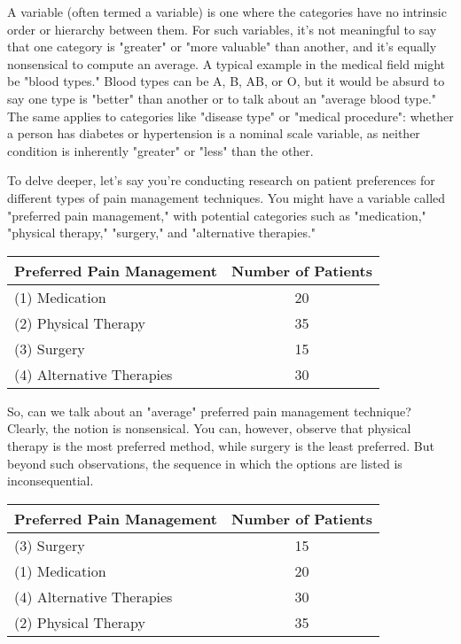 
A  variable (often termed a  variable) is one where the categories have no intrinsic order or hierarchy between them. For such variables, it's not meaningful to say that one category is "greater" or "more valuable" than another, and it's equally nonsensical to compute an average. A typical example in the medical field might be "blood types." Blood types can be A, B, AB, or O, but it would be absurd to say one type is "better" than another or to talk about an "average blood type." The same applies to categories like "disease type" or "medical procedure": whether a person has diabetes or hypertension is a nominal scale variable, as neither condition is inherently "greater" or "less" than the other.

To delve deeper, let's say you're conducting research on patient preferences for different types of pain management techniques. You might have a variable called "preferred pain management," with potential categories such as "medication," "physical therapy," "surgery," and "alternative therapies."

\vspace*{6pt}
\begin{tabular}{lc}
Preferred Pain Management & Number of Patients \\ \hline
(1) Medication & 20 \\
(2) Physical Therapy & 35 \\
(3) Surgery & 15 \\
(4) Alternative Therapies & 30 \\
\hline
\end{tabular}
\vspace*{6pt}

So, can we talk about an "average" preferred pain management technique? Clearly, the notion is nonsensical. You can, however, observe that physical therapy is the most preferred method, while surgery is the least preferred. But beyond such observations, the sequence in which the options are listed is inconsequential.

\vspace*{6pt}
\begin{tabular}{lc}
Preferred Pain Management & Number of Patients \\ \hline
(3) Surgery & 15 \\
(1) Medication & 20 \\
(4) Alternative Therapies & 30 \\
(2) Physical Therapy & 35 \\
\hline
\end{tabular}
\vspace*{6pt}

